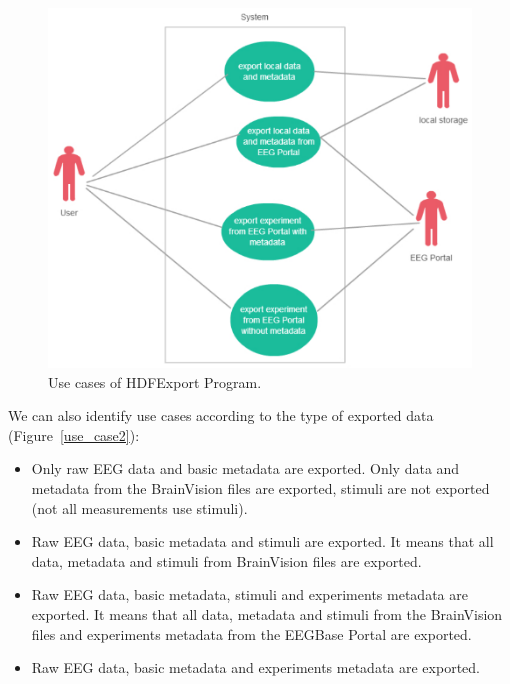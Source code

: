 \documentclass[conference]{IEEEtran}
\begin{document}
\begin{figure}
	\includegraphics[scale=0.5]{obrazky/use_case_location.pdf}	
	\caption{Use cases of HDFExport Program.}
	\label{use_case1}
\end{figure}
We can also identify use cases according to the type of exported data (Figure~\ref{use_case2}):
\begin{itemize}
	\item Only raw EEG data and basic metadata are exported.
Only data and metadata from the BrainVision files are exported, stimuli are not exported (not all measurements use stimuli).
	\item Raw EEG data, basic metadata and stimuli are exported.
It means that all data, metadata and stimuli from BrainVision files are exported.
	\item Raw EEG data, basic metadata, stimuli and experiments metadata are exported. It means that all data, metadata and stimuli from the BrainVision files and experiments metadata from the EEGBase Portal are exported.
	\item Raw EEG data, basic metadata and experiments metadata are exported. 

\end{itemize}
\end{document}
